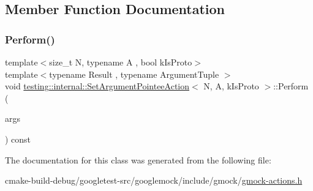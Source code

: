 \subsection{Member Function Documentation}
\mbox{\label{classtesting_1_1internal_1_1SetArgumentPointeeAction_a128320dcf991ff7f1a0087dab38b4014}} 
\subsubsection{\texorpdfstring{Perform()}{Perform()}}
{\footnotesize\ttfamily template$<$size\+\_\+t N, typename A , bool k\+Is\+Proto$>$ \\
template$<$typename Result , typename Argument\+Tuple $>$ \\
void \mbox{\hyperlink{classtesting_1_1internal_1_1SetArgumentPointeeAction}{testing\+::internal\+::\+Set\+Argument\+Pointee\+Action}}$<$ N, A, k\+Is\+Proto $>$\+::Perform (\begin{DoxyParamCaption}\item[{const Argument\+Tuple \&}]{args }\end{DoxyParamCaption}) const\hspace{0.3cm}{\ttfamily [inline]}}



The documentation for this class was generated from the following file\+:\begin{DoxyCompactItemize}
\item 
cmake-\/build-\/debug/googletest-\/src/googlemock/include/gmock/\mbox{\hyperlink{gmock-actions_8h}{gmock-\/actions.\+h}}\end{DoxyCompactItemize}
